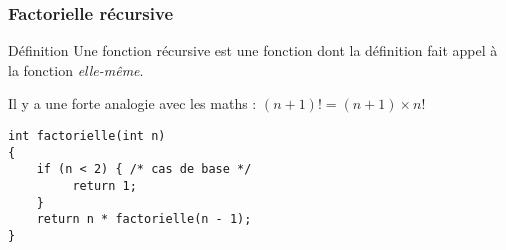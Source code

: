\documentclass[xcolor=pdftex,svgnames,table]{beamer}
\begin{document}
\begin{frame}[fragile]
  \frametitle{Factorielle récursive}
  \begin{block}{Définition}
    Une fonction récursive est une fonction dont la définition fait
    appel à la fonction \emph{elle-même}.
  \end{block}

\pause
Il y a une forte analogie avec les maths : $(n + 1)! = (n + 1) \times n!$

\pause
\begin{lstlisting}[escapechar={\%},basicstyle=\ttfamily\small]
int factorielle(int n)
{
    if (n < 2) { /* cas de base */
         return 1;
    }
    return n * factorielle(n - 1);
}
\end{lstlisting}
\end{frame}
\end{document}
